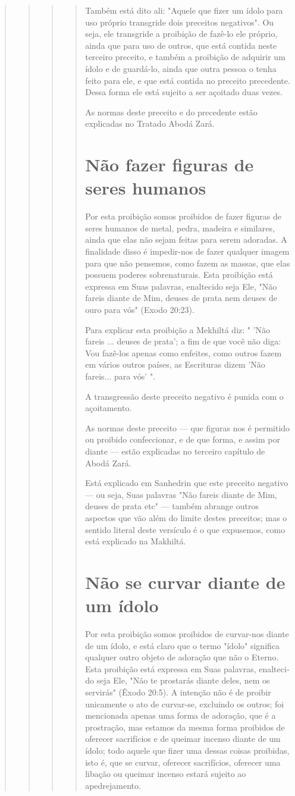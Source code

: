\begin{quote}
\begin{quote}
\begin{quote}
\begin{quote}
Também está dito ali: "Aquele que fizer um ídolo para uso próprio
transgride dois preceitos negativos". Ou seja, ele transgride a
proibição de fazê-lo ele próprio, ainda que para uso de outros, que está
contida neste terceiro pre­ceito, e também a proibição de adquirir um
ídolo e de guardá-lo, ainda que ou­tra pessoa o tenha feito para ele, e
que está contida no preceito precedente. Dessa forma ele está sujeito a
ser açoitado duas vezes.

As normas deste preceito e do precedente estão explicadas no Tra­tado
Abodá Zará.

\section{Não fazer figuras de seres humanos}

Por esta proibição somos proibidos de fazer figuras de seres huma­nos de
metal, pedra, madeira e similares, ainda que elas não sejam feitas para
serem adoradas. A finalidade disso é impedir-nos de fazer qualquer
imagem pa­ra que não pensemos, como fazem as massas, que elas possuem
poderes sobre­naturais. Esta proibição está expressa em Suas palavras,
enaltecido seja Ele, "Não fareis diante de Mim, deuses de prata nem
deuses de ouro para vós" (Exodo 20:23).

Para explicar esta proibição a Mekhiltá diz: " 'Não fareis ... deuses de
prata'; a fim de que você não diga: Vou fazê-los apenas como enfeites,
como outros fazem em vários outros países, as Escrituras dizem 'Não
fareis... para vós' ".

A transgressão deste preceito negativo é punida com o açoitamento.

As normas deste preceito --- que figuras nos é permitido ou proibi­do
confeccionar, e de que forma, e assim por diante --- estão explicadas no
ter­ceiro capítulo de Abodá Zará.

Está explicado em Sanhedrin que este preceito negativo --- ou seja, Suas
palavras "Não fareis diante de Mim, deuses de prata etc" --- também
abrange outros aspectos que vão além do limite destes preceitos; mas o
sentido literal deste versículo é o que expusemos, como está explicado
na Makhiltá.

\section{Não se curvar diante de um ídolo}

Por esta proibição somos proibidos de curvar-nos diante de um ído­lo, e
está claro que o termo "ídolo" significa qualquer outro objeto de
adora­ção que não o Eterno. Esta proibição está expressa em Suas
palavras, enalteci­do seja Ele, "Não te prostarás diante deles, nem os
servirás" (Êxodo 20:5). A intenção não é de proibir unicamente o ato de
curvar-se, excluindo os outros; foi mencionada apenas uma forma de
adoração, que é a prostração, mas esta­mos da mesma forma proibidos de
oferecer sacrifícios e de queimar incenso diante de um ídolo; todo
aquele que fizer uma dessas coisas proibidas, isto é, que se curvar,
oferecer sacrifícios, oferecer uma libação ou queimar incenso estará
sujeito ao apedrejamento.


\end{quote}
\end{quote}
\end{quote}
\end{quote}
